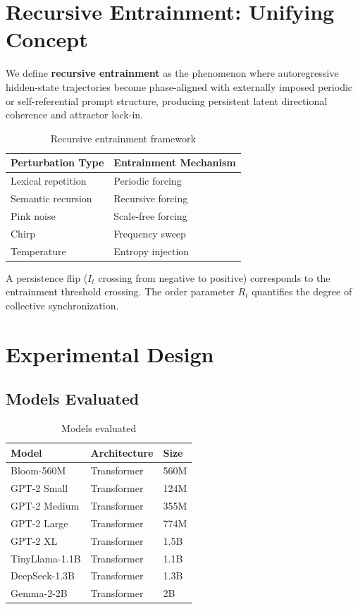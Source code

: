 \documentclass{article}
\begin{document}
\section{Recursive Entrainment: Unifying Concept}

We define \textbf{recursive entrainment} as the phenomenon where autoregressive hidden-state trajectories become phase-aligned with externally imposed periodic or self-referential prompt structure, producing persistent latent directional coherence and attractor lock-in.

\begin{table}[H]
\centering
\caption{Recursive entrainment framework}
\label{tab:entrainment}
\begin{tabular}{ll}
\toprule
Perturbation Type & Entrainment Mechanism \\
\midrule
Lexical repetition & Periodic forcing \\
Semantic recursion & Recursive forcing \\
Pink noise & Scale-free forcing \\
Chirp & Frequency sweep \\
Temperature & Entropy injection \\
\bottomrule
\end{tabular}
\end{table}

A persistence flip ($I_t$ crossing from negative to positive) corresponds to the entrainment threshold crossing. The order parameter $R_t$ quantifies the degree of collective synchronization.

\section{Experimental Design}

\subsection{Models Evaluated}

\begin{table}[H]
\centering
\caption{Models evaluated}
\label{tab:models}
\begin{tabular}{lll}
\toprule
Model & Architecture & Size \\
\midrule
Bloom-560M & Transformer & 560M \\
GPT-2 Small & Transformer & 124M \\
GPT-2 Medium & Transformer & 355M \\
GPT-2 Large & Transformer & 774M \\
GPT-2 XL & Transformer & 1.5B \\
TinyLlama-1.1B & Transformer & 1.1B \\
DeepSeek-1.3B & Transformer & 1.3B \\
Gemma-2-2B & Transformer & 2B \\
\bottomrule
\end{tabular}
\end{table}
\end{document}
